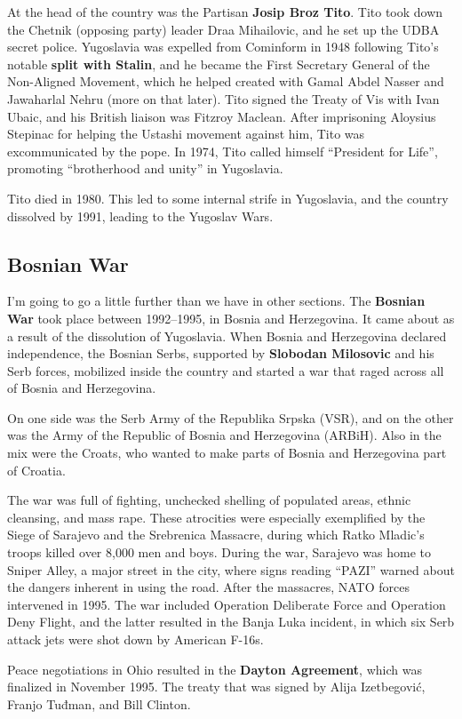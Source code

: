 At the head of the country was the Partisan \textbf{Josip Broz Tito}.
Tito took down the Chetnik (opposing party) leader Draa Mihailovic, and he set up the UDBA secret police.
Yugoslavia was expelled from Cominform in 1948 following Tito's notable \textbf{split with Stalin},
and he became the First Secretary General of the Non-Aligned Movement,
which he helped created with Gamal Abdel Nasser and Jawaharlal Nehru (more on that later).
Tito signed the Treaty of Vis with Ivan Ubaic, and his British liaison was Fitzroy Maclean.
After imprisoning Aloysius Stepinac for helping the Ustashi movement against him,
Tito was excommunicated by the pope.
In 1974, Tito called himself ``President for Life'', promoting ``brotherhood and unity'' in Yugoslavia.

Tito died in 1980.
This led to some internal strife in Yugoslavia, and the country dissolved by 1991, leading to the Yugoslav Wars.

\subsection*{Bosnian War}

I'm going to go a little further than we have in other sections.
The \textbf{Bosnian War} took place between 1992--1995, in Bosnia and Herzegovina.
It came about as a result of the dissolution of Yugoslavia.
When Bosnia and Herzegovina declared independence,
the Bosnian Serbs, supported by \textbf{Slobodan Milosovic} and his Serb forces,
mobilized inside the country and started a war that raged across all of Bosnia and Herzegovina.

On one side was the Serb Army of the Republika Srpska (VSR),
and on the other was the Army of the Republic of Bosnia and Herzegovina (ARBiH).
Also in the mix were the Croats, who wanted to make parts of Bosnia and Herzegovina part of Croatia.

The war was full of fighting, unchecked shelling of populated areas, ethnic cleansing, and mass rape.
These atrocities were especially exemplified by the Siege of Sarajevo
and the Srebrenica Massacre, during which Ratko Mladic's troops killed over 8,000 men and boys.
During the war, Sarajevo was home to Sniper Alley, a major street in the city,
where signs reading ``PAZI'' warned about the dangers inherent in using the road.
After the massacres, NATO forces intervened in 1995.
The war included Operation Deliberate Force and Operation Deny Flight,
and the latter resulted in the Banja Luka incident,
in which six Serb attack jets were shot down by American F-16s.

Peace negotiations in Ohio resulted in the \textbf{Dayton Agreement}, which was finalized in November 1995.
The treaty that was signed by Alija Izetbegović, Franjo Tuđman, and Bill Clinton.
